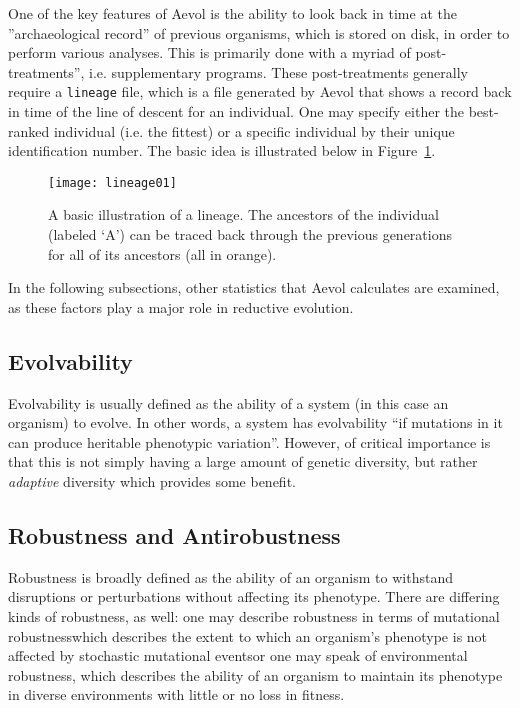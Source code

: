 One of the key features of Aevol is the ability to look back in time at the ''archaeological record'' of previous organisms, which is stored on disk, in order to perform various analyses. This is primarily done with a myriad of post-treatments'', i.e. supplementary programs. These post-treatments generally require a \texttt{lineage} file, which is a file generated by Aevol that shows a record back in time of the line of descent for an individual. One may specify either the best-ranked individual (i.e. the fittest) or a specific individual by their unique identification number. The basic idea is illustrated below in Figure~\ref{fig:lineage01}. 

\begin{figure}[H]
	\texttt{[image: lineage01]}
	\centering
	\caption[Lineage basic illustration.]{A basic illustration of a lineage. The ancestors of the individual (labeled `A') can be traced back through the previous generations for all of its ancestors (all in orange).}
	\label{fig:lineage01}
\end{figure}

In the following subsections, other statistics that Aevol calculates are examined, as these factors play a major role in reductive evolution. 

\subsection{Evolvability}\label{subsec:evolvability}
Evolvability is usually defined as the ability of a system (in this case an organism) to evolve. In other words, a system has evolvability ``if mutations in it can produce heritable phenotypic variation''\cite{doi:10.1098/rspb.2007.1137}. However, of critical importance is that this is not simply having a large amount of genetic diversity, but rather \textit{adaptive} diversity which provides some benefit. 


\subsection{Robustness and Antirobustness}\label{subsec:robustness_antirobustness}
Robustness is broadly defined as the ability of an organism to withstand disruptions or perturbations without affecting its phenotype. There are differing kinds of robustness, as well: one may describe robustness in terms of mutational robustness\textendash which describes the extent to which an organism's phenotype is not affected by stochastic mutational events\textendash or one may speak of environmental robustness, which describes the ability of an organism to maintain its phenotype in diverse environments with little or no loss in fitness. 

